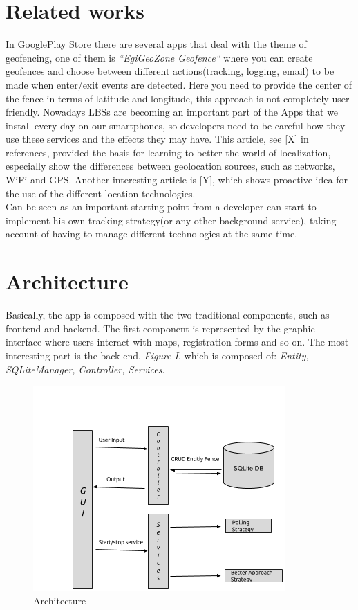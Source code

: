 \documentclass[conference]{IEEEtran}
\begin{document}
\section{Related works}
In GooglePlay Store there are several apps that deal with the theme of geofencing, one of them is 
\textit{``EgiGeoZone Geofence``} where you can create geofences and choose between different actions(tracking, logging, email) to be made when enter/exit events are detected.
Here you need to provide the center of the fence in terms of latitude and longitude, this approach is not completely user-friendly.
Nowadays LBSs are becoming an important part of the Apps that we install every day on our smartphones, so developers need to be careful how they use 
these services and the effects they may have.
This article, see [X] in references, provided the basis for learning to better the world of localization, especially show the differences between geolocation sources, 
such as networks, WiFi and GPS.
Another interesting article is [Y], which shows proactive idea for the use of the different location technologies.\\
Can be seen as an important starting point from a developer can start to implement his own tracking strategy(or any other background service), taking account of having 
to manage different technologies at the same time.

\section{Architecture}
Basically, the app is composed with the two traditional components, such as frontend and backend.
The first component is represented by the graphic interface where users interact with maps, registration forms and so on.
The most interesting part is the back-end, \textit{Figure I}, which is composed of: \textit{Entity, SQLiteManager, Controller, Services}.

\begin{figure}
\centering
\includegraphics[scale=0.6]{architecture}
\caption{Architecture}
\end{figure}
\end{document}
